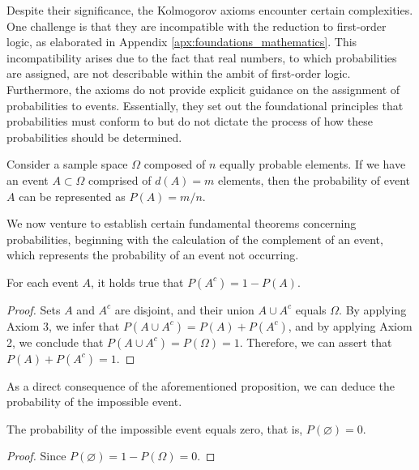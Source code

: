 Despite their significance, the Kolmogorov axioms encounter certain complexities. One challenge is that they are incompatible with the reduction to first-order logic, as elaborated in Appendix \ref{apx:foundations_mathematics}. This incompatibility arises due to the fact that real numbers, to which probabilities are assigned, are not describable within the ambit of first-order logic. Furthermore, the axioms do not provide explicit guidance on the assignment of probabilities to events. Essentially, they set out the foundational principles that probabilities must conform to but do not dictate the process of how these probabilities should be determined.

\begin{example}
\label{ex:discrete_sample_space}
Consider a sample space $\Omega$ composed of $n$ equally probable elements. If we have an event $A \subset \Omega$ comprised of $d(A) = m$ elements, then the probability of event $A$ can be represented as $P(A) = m/n$.
\end{example}

We now venture to establish certain fundamental theorems concerning probabilities, beginning with the calculation of the complement of an event, which represents the probability of an event not occurring.

\begin{proposition}
For each event $A$, it holds true that $P \left( A^{c} \right) = 1 - P \left( A \right)$.
\end{proposition}
\begin{proof}
Sets $A$ and $A^c$ are disjoint, and their union $A \cup A^c$ equals $\Omega$. By applying Axiom 3, we infer that $P \left( A \cup A^c \right) = P \left( A \right) + P \left( A^c \right)$, and by applying Axiom 2, we conclude that $P \left( A \cup A^c \right) = P(\Omega) = 1$. Therefore, we can assert that $P \left( A \right) + P \left( A^c \right) = 1$.
\end{proof}

As a direct consequence of the aforementioned proposition, we can deduce the probability of the impossible event.

\begin{proposition}
The probability of the impossible event equals zero, that is, $P \left( \varnothing \right) = 0$.
\end{proposition}
\begin{proof}
Since $P \left( \varnothing \right) = 1 - P \left( \Omega \right) = 0$.
\end{proof}

